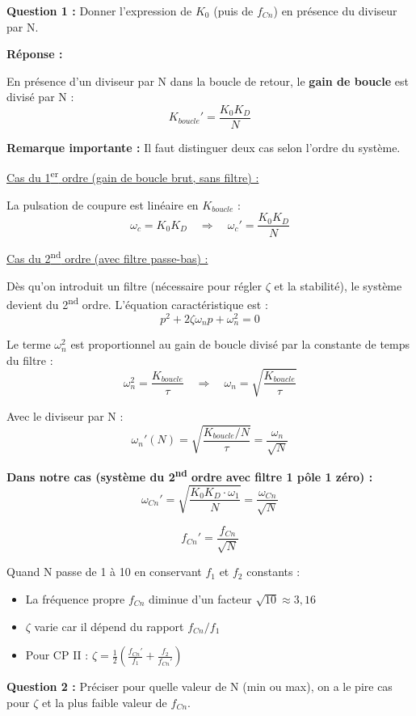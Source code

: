 \documentclass[a4paper,11pt]{article}
\begin{document}
\textbf{Question 1 :} Donner l'expression de $K_0$ (puis de $f_{Cn}$) en présence du diviseur par N.

\vspace{0.3cm}
\textbf{Réponse :}

En présence d'un diviseur par N dans la boucle de retour, le \textbf{gain de boucle} est divisé par N :
\[
K_{boucle}' = \frac{K_0 K_D}{N}
\]

\textbf{Remarque importante :} Il faut distinguer deux cas selon l'ordre du système.

\underline{Cas du 1\textsuperscript{er} ordre (gain de boucle brut, sans filtre) :}

La pulsation de coupure est linéaire en $K_{boucle}$ :
\[
\omega_c = K_0 K_D \quad \Rightarrow \quad \omega_c' = \frac{K_0 K_D}{N}
\]

\underline{Cas du 2\textsuperscript{nd} ordre (avec filtre passe-bas) :}

Dès qu'on introduit un filtre (nécessaire pour régler $\zeta$ et la stabilité), le système devient du 2\textsuperscript{nd} ordre. L'équation caractéristique est :
\[
p^2 + 2\zeta\omega_n p + \omega_n^2 = 0
\]

Le terme $\omega_n^2$ est proportionnel au gain de boucle divisé par la constante de temps du filtre :
\[
\omega_n^2 = \frac{K_{boucle}}{\tau} \quad \Rightarrow \quad \omega_n = \sqrt{\frac{K_{boucle}}{\tau}}
\]

Avec le diviseur par N :
\[
\omega_n'(N) = \sqrt{\frac{K_{boucle}/N}{\tau}} = \frac{\omega_n}{\sqrt{N}}
\]

\textbf{Dans notre cas (système du 2\textsuperscript{nd} ordre avec filtre 1 pôle 1 zéro) :}
\[
\omega_{Cn}' = \sqrt{\frac{K_0 K_D \cdot \omega_1}{N}} = \frac{\omega_{Cn}}{\sqrt{N}}
\]

\[
\boxed{f_{Cn}' = \frac{f_{Cn}}{\sqrt{N}}}
\]

Quand N passe de 1 à 10 en conservant $f_1$ et $f_2$ constants :
\begin{itemize}
    \item La fréquence propre $f_{Cn}$ diminue d'un facteur $\sqrt{10} \approx 3{,}16$
    \item $\zeta$ varie car il dépend du rapport $f_{Cn}/f_1$
    \item Pour CP II : $\zeta = \frac{1}{2}\left(\frac{f_{Cn}'}{f_1} + \frac{f_2}{f_{Cn}'}\right)$
\end{itemize}

\vspace{0.5cm}
\textbf{Question 2 :} Préciser pour quelle valeur de N (min ou max), on a le pire cas pour $\zeta$ et la plus faible valeur de $f_{Cn}$.
\end{document}
